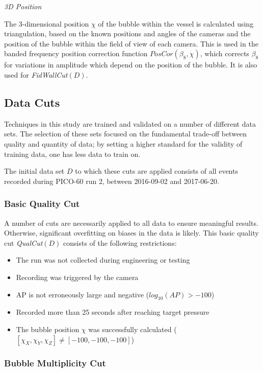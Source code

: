 \documentclass[10pt]{article}
\begin{document}
\textit{3D Position}

The 3-dimensional position $\chi$ of the bubble within the vessel is calculated using triangulation, based on the known positions and angles of the cameras and the position of the bubble within the field of view of each camera. This is used in the banded frequency position correction function $PosCor(\beta _{8}, \chi)$, which corrects $\beta _{8}$ for variations in amplitude which depend on the position of the bubble. It is also used for {\it FidWallCut}$(D)$.

\subsection{Data Cuts}

Techniques in this study are trained and validated on a number of different data sets. The selection of these sets focused on the fundamental trade-off between quality and quantity of data; by setting a higher standard for the validity of training data, one has less data to train on.

The initial data set $D$ to which these cuts are applied consists of all events recorded during PICO-60 run 2, between 2016-09-02 and 2017-06-20.

\subsubsection{Basic Quality Cut}

A number of cuts are necessarily applied to all data to ensure meaningful results. Otherwise, significant overfitting on biases in the data is likely. This basic quality cut {\it QualCut}$(D)$ consists of the following restrictions:

\begin{itemize}
    \item The run was not collected during engineering or testing
    \item Recording was triggered by the camera
    \item AP is not erroneously large and negative ($log_{10}(AP)>-100$)
    \item Recorded more than 25 seconds after reaching target pressure
    \item The bubble position $\chi$ was successfully calculated ($[\chi_{X}, \chi_{Y}, \chi_{Z}]\neq[-100, -100, -100]$)
\end{itemize}

\subsubsection{Bubble Multiplicity Cut}
\end{document}
